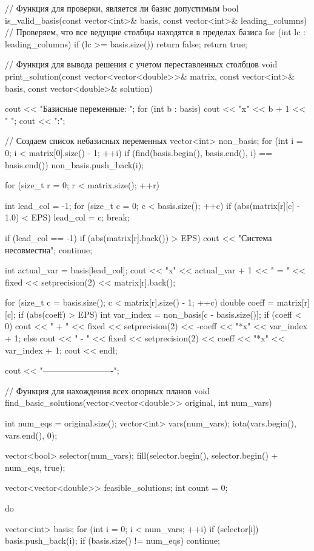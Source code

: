 \documentclass{report}
\begin{document}
\begin{code}
// Функция для проверки, является ли базис допустимым
bool is_valid_basis(const vector<int>& basis, const vector<int>& leading_columns) {
	// Проверяем, что все ведущие столбцы находятся в пределах базиса
	for (int lc : leading_columns) {
		if (lc >= basis.size()) return false;
	}
	return true;
}

// Функция для вывода решения с учетом переставленных столбцов
void print_solution(const vector<vector<double>>& matrix, const vector<int>& basis, const vector<double>& solution) {
	cout << "Базисные переменные: ";
	for (int b : basis) cout << "x" << b + 1 << " ";
	cout << ":\n";
	
	// Создаем список небазисных переменных
	vector<int> non_basis;
	for (int i = 0; i < matrix[0].size() - 1; ++i) {
		if (find(basis.begin(), basis.end(), i) == basis.end()) {
			non_basis.push_back(i);
		}
	}
	
	for (size_t r = 0; r < matrix.size(); ++r) {
		int lead_col = -1;
		for (size_t c = 0; c < basis.size(); ++c) {
			if (abs(matrix[r][c] - 1.0) < EPS) {
				lead_col = c;
				break;
			}
		}
		
		if (lead_col == -1) {
			if (abs(matrix[r].back()) > EPS)
			cout << "Система несовместна\n";
			continue;
		}
		
		int actual_var = basis[lead_col];
		cout << "x" << actual_var + 1 << " = " << fixed << setprecision(2) << matrix[r].back();
		
		for (size_t c = basis.size(); c < matrix[r].size() - 1; ++c) {
			double coeff = matrix[r][c];
			if (abs(coeff) > EPS) {
				int var_index = non_basis[c - basis.size()];
				if (coeff < 0) {
					cout << " + " << fixed << setprecision(2) << -coeff << "*x" << var_index + 1;
				}
				else {
					cout << " - " << fixed << setprecision(2) << coeff << "*x" << var_index + 1;
				}
			}
		}
		cout << endl;
	}
	cout << "-------------------------\n";
}

// Функция для нахождения всех опорных планов
void find_basic_solutions(vector<vector<double>> original, int num_vars) {
	int num_eqs = original.size();
	vector<int> vars(num_vars);
	iota(vars.begin(), vars.end(), 0);
	
	vector<bool> selector(num_vars);
	fill(selector.begin(), selector.begin() + num_eqs, true);
	
	vector<vector<double>> feasible_solutions;
	int count = 0;
	
	do {
		vector<int> basis;
		for (int i = 0; i < num_vars; ++i)
		if (selector[i]) basis.push_back(i);
		if (basis.size() != num_eqs) continue;
		
}}
\end{code}
\end{document}
